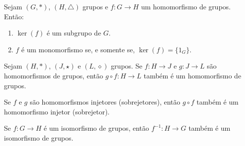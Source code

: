 \documentclass{beamer}
\begin{document}
    \begin{frame}
        \begin{proposicao}
            Sejam $(G, *)$, \pause $(H, \triangle)$ grupos \pause e $f : G \to H$ um homomorfismo de grupos. \pause Então: \pause
            \vspace{.5cm}

            \begin{enumerate}[label={\roman*})]
                \item $\ker(f)$ é um subgrupo de $G$. \pause

                \vspace{.5cm}

                \item $f$ é um monomorfismo se, e somente se, $\ker(f) = \{1_G\}$.

                \vspace{.5cm}
            \end{enumerate}
        \end{proposicao}
    \end{frame}

    \begin{frame}
        \begin{proposicao}
            Sejam $(H, *)$, $(J, \star)$ e $(L, \diamond)$ grupos. \pause Se $f : H \to J$ \pause e $g : J \to L$ \pause são homomorfismos de grupos, \pause então $g \circ f : H \to L$ \pause também é um homomorfismo de grupos.
        \end{proposicao}
        \vspace{2cm}
    \end{frame}

    \begin{frame}
        \begin{corolario}
            Se $f$ e $g$ são homomorfismos \pause injetores \pause (sobrejetores), então $g \circ f$ \pause também é um homomorfismo injetor \pause (sobrejetor).
        \end{corolario}
        \vspace{2cm}
    \end{frame}

    \begin{frame}
        \begin{proposicao}
            Se $f : G \to H$ é um isomorfismo de grupos, \pause então $f^{-1} : H \to G$ \pause também é um isomorfismo de grupos.
        \end{proposicao}
    \end{frame}
\end{document}
